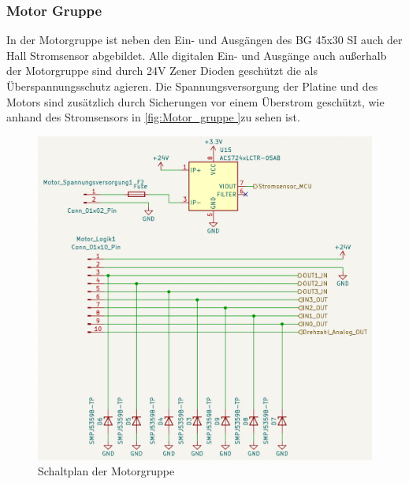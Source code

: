 \subsubsection{Motor Gruppe}
In der Motorgruppe ist neben den Ein- und Ausgängen des BG 45x30 SI auch der Hall Stromsensor abgebildet. Alle digitalen Ein- und Ausgänge auch außerhalb der Motorgruppe sind durch 24V Zener Dioden geschützt die als Überspannungsschutz agieren. Die Spannungsversorgung der Platine und des Motors sind zusätzlich durch Sicherungen vor einem Überstrom geschützt, wie anhand des Stromsensors in \autoref{fig:Motor_gruppe }zu sehen ist.
\begin{figure}[H]
	\centering
	\includegraphics[width=1.0\textwidth]{images/Hardware/Motor_Schaltplan.PNG}
	\caption{Schaltplan der Motorgruppe}
	\label{fig:Motor_gruppe}
\end{figure}

